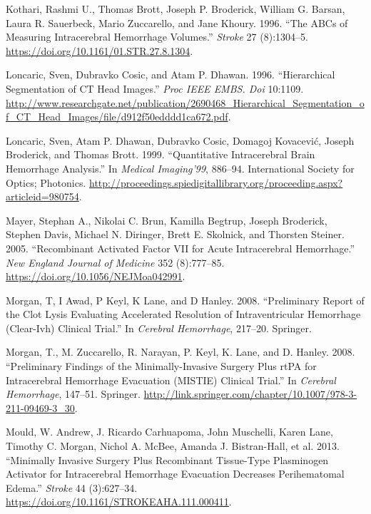 \documentclass[]{elsarticle} %
\begin{document}
\leavevmode\hypertarget{ref-kothari_abcs_1996}{}%
Kothari, Rashmi U., Thomas Brott, Joseph P. Broderick, William G.
Barsan, Laura R. Sauerbeck, Mario Zuccarello, and Jane Khoury. 1996.
``The ABCs of Measuring Intracerebral Hemorrhage Volumes.''
\emph{Stroke} 27 (8):1304--5.
\url{https://doi.org/10.1161/01.STR.27.8.1304}.

\leavevmode\hypertarget{ref-loncaric_hierarchical_1996}{}%
Loncaric, Sven, Dubravko Cosic, and Atam P. Dhawan. 1996. ``Hierarchical
Segmentation of CT Head Images.'' \emph{Proc IEEE EMBS. Doi} 10:1109.
\url{http://www.researchgate.net/publication/2690468_Hierarchical_Segmentation_of_CT_Head_Images/file/d912f50edddd1ca672.pdf}.

\leavevmode\hypertarget{ref-loncaric_quantitative_1999}{}%
Loncaric, Sven, Atam P. Dhawan, Dubravko Cosic, Domagoj Kovacević,
Joseph Broderick, and Thomas Brott. 1999. ``Quantitative Intracerebral
Brain Hemorrhage Analysis.'' In \emph{Medical Imaging'99}, 886--94.
International Society for Optics; Photonics.
\url{http://proceedings.spiedigitallibrary.org/proceeding.aspx?articleid=980754}.

\leavevmode\hypertarget{ref-mayer_recombinant_2005}{}%
Mayer, Stephan A., Nikolai C. Brun, Kamilla Begtrup, Joseph Broderick,
Stephen Davis, Michael N. Diringer, Brett E. Skolnick, and Thorsten
Steiner. 2005. ``Recombinant Activated Factor VII for Acute
Intracerebral Hemorrhage.'' \emph{New England Journal of Medicine} 352
(8):777--85. \url{https://doi.org/10.1056/NEJMoa042991}.

\leavevmode\hypertarget{ref-morgan_preliminary_2008_clear}{}%
Morgan, T, I Awad, P Keyl, K Lane, and D Hanley. 2008. ``Preliminary
Report of the Clot Lysis Evaluating Accelerated Resolution of
Intraventricular Hemorrhage (Clear-Ivh) Clinical Trial.'' In
\emph{Cerebral Hemorrhage}, 217--20. Springer.

\leavevmode\hypertarget{ref-morgan_preliminary_2008_mistie}{}%
Morgan, T., M. Zuccarello, R. Narayan, P. Keyl, K. Lane, and D. Hanley.
2008. ``Preliminary Findings of the Minimally-Invasive Surgery Plus rtPA
for Intracerebral Hemorrhage Evacuation (MISTIE) Clinical Trial.'' In
\emph{Cerebral Hemorrhage}, 147--51. Springer.
\url{http://link.springer.com/chapter/10.1007/978-3-211-09469-3_30}.

\leavevmode\hypertarget{ref-mould_minimally_2013}{}%
Mould, W. Andrew, J. Ricardo Carhuapoma, John Muschelli, Karen Lane,
Timothy C. Morgan, Nichol A. McBee, Amanda J. Bistran-Hall, et al. 2013.
``Minimally Invasive Surgery Plus Recombinant Tissue-Type Plasminogen
Activator for Intracerebral Hemorrhage Evacuation Decreases
Perihematomal Edema.'' \emph{Stroke} 44 (3):627--34.
\url{https://doi.org/10.1161/STROKEAHA.111.000411}.
\end{document}
